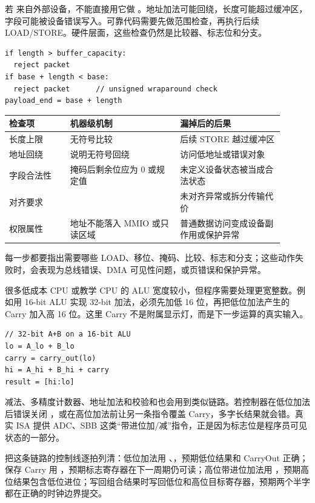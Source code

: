 若  来自外部设备，不能直接用它做 。地址加法可能回绕，长度可能超过缓冲区，字段可能被设备错误写入。可靠代码需要先做范围检查，再执行后续 LOAD/STORE。硬件层面，这些检查仍然是比较器、标志位和分支。

\begin{lstlisting}
if length > buffer_capacity:
  reject packet
if base + length < base:
  reject packet      // unsigned wraparound check
payload_end = base + length
\end{lstlisting}

\begin{longtable}{L{0.2\linewidth}L{0.36\linewidth}L{0.34\linewidth}}
\toprule
检查项 & 机器级机制 & 漏掉后的后果 \\
\midrule
长度上限 & 无符号比较  & 后续 STORE 越过缓冲区 \\
地址回绕 &  说明无符号回绕 & 访问低地址或错误对象 \\
字段合法性 & 掩码后剩余位应为 0 或规定值 & 未定义设备状态被当成合法状态 \\
对齐要求 &  & 未对齐异常或拆分传输代价 \\
权限属性 & 地址不能落入 MMIO 或只读区域 & 普通数据访问变成设备副作用或保护异常 \\
\bottomrule
\end{longtable}

每一步都要指出需要哪些 LOAD、移位、掩码、比较、标志和分支；这些动作失败时，会表现为总线错误、DMA 可见性问题，或页错误和保护异常。

很多低成本 CPU 或教学 CPU 的 ALU 宽度较小，但程序需要处理更宽整数。例如用 16-bit ALU 实现 32-bit 加法，必须先加低 16 位，再把低位加法产生的 Carry 加入高 16 位。这里 Carry 不是附属显示灯，而是下一步运算的真实输入。

\begin{lstlisting}
// 32-bit A+B on a 16-bit ALU
lo = A_lo + B_lo
carry = carry_out(lo)
hi = A_hi + B_hi + carry
result = [hi:lo]
\end{lstlisting}

减法、多精度计数器、地址加法和校验和也会用到类似链路。若控制器在低位加法后错误关闭 ，或在高位加法前让另一条指令覆盖 Carry，多字长结果就会错。真实 ISA 提供 ADC、SBB 这类“带进位加/减”指令，正是因为标志位是程序员可见状态的一部分。

把这条链路的控制线逐拍列清：低位加法用 、，预期低位结果和 CarryOut 正确；保存 Carry 用 ，预期标志寄存器在下一周期仍可读；高位带进位加法用 ，预期高位结果包含低位进位；写回组合结果时写回低位和高位目标寄存器，预期两个半字都在正确的时钟边界提交。

